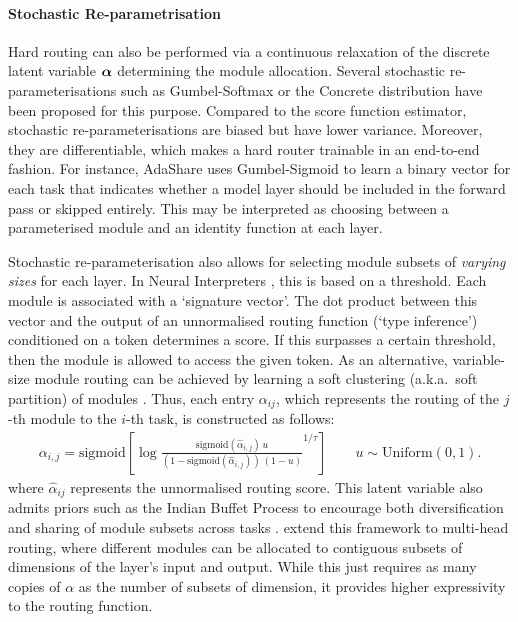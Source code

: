 \documentclass[10pt]{article} %
\begin{document}
\paragraph*{Stochastic Re-parametrisation}
Hard routing can also be performed via a continuous relaxation of the discrete latent variable ${\bm{\alpha}}$ determining the module allocation. Several stochastic re-parameterisations such as Gumbel-Softmax \citep{Jang2017Gumbel} or the Concrete distribution \citep{maddison2017the} have been proposed for this purpose. Compared to the score function estimator, stochastic re-parameterisations are biased but have lower variance. Moreover, they are differentiable, which makes a hard router trainable in an end-to-end fashion. For instance, AdaShare \citep{sun2020adashare} uses Gumbel-Sigmoid to learn a binary vector for each task that indicates whether a model layer should be included in the forward pass or skipped entirely. This may be interpreted as choosing between a parameterised module and an identity function at each layer.

Stochastic re-parameterisation also allows for selecting module subsets of \textit{varying sizes} for each layer. In Neural Interpreters \citep{rahaman2021dynamic}, this is based on a threshold. Each module is associated with a `signature vector'. The dot product between this vector and the output of an unnormalised routing function (`type inference') conditioned on a token determines a score. If this surpasses a certain threshold, then the module is allowed to access the given token. As an alternative, variable-size module routing can be achieved by learning a soft clustering (a.k.a.\ soft partition) of modules \citep{ponti2022combining,caccia2022multihead}. Thus, each entry $\alpha_{ij}$, which represents the routing of the $j$-th module to the $i$-th task, is constructed as follows:
\begin{align} \label{eq:allocation}
    {\alpha}_{i,j} =  \textrm{sigmoid} \left[ \log \frac{\textrm{sigmoid}({\hat\alpha}_{i,j}) \, u}{(1 - \textrm{sigmoid}({\hat\alpha}_{i,j})) \, (1 - u)}^{1/\tau}\right] \qquad u \sim \mathrm{Uniform}(0, 1).
\end{align}
where $\hat\alpha_{ij}$ represents the unnormalised routing score.
This latent variable also admits priors such as the Indian Buffet Process \citep{griffiths2011indian} to encourage both diversification and sharing of module subsets across tasks \citep{ponti2022combining}. \citet{caccia2022multihead} extend this framework to multi-head routing, where different modules can be allocated to contiguous subsets of dimensions of the layer's input and output. While this just requires as many copies of $\alpha$ as the number of subsets of dimension, it provides higher expressivity to the routing function.
\end{document}
